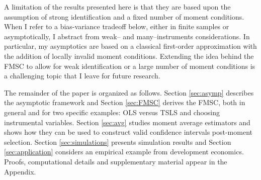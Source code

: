 A limitation of the results presented here is that they are based upon the assumption of strong identification and a fixed number of moment conditions.
When I refer to a bias-variance tradeoff below, either in finite samples or asymptotically, I abstract from weak-- and many--instruments considerations.
In particular, my asymptotics are based on a classical first-order approximation with the addition of locally invalid moment conditions.
Extending the idea behind the FMSC to allow for weak identification or a large number of moment conditions is a challenging topic that I leave for future research.

The remainder of the paper is organized as follows.
Section \ref{sec:asymp} describes the asymptotic framework and Section \ref{sec:FMSC} derives the FMSC, both in general and for two specific examples: OLS versus TSLS and choosing instrumental variables.
Section \ref{sec:avg} studies moment average estimators and shows how they can be used to construct valid confidence intervals post-moment selection.
Section \ref{sec:simulations} presents simulation results and Section \ref{sec:application} considers an empirical example from development economics.
Proofs, computational details and supplementary material appear in the Appendix. 
